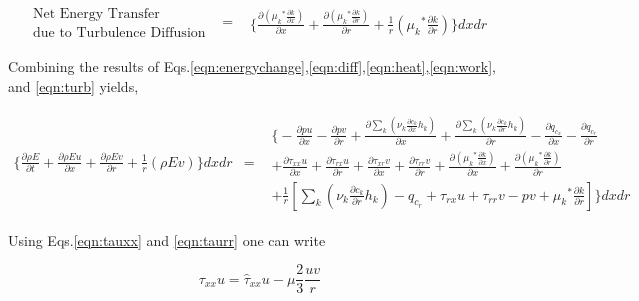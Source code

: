 \begin{equation}
	\begin{array}{ccc}
	\begin{array}{c}
	\textrm{Net Energy Transfer} \\ \textrm{due to Turbulence Diffusion}
	\end{array} & = &
		\begin{array}{c}
			\Big\{\frac{\partial ({\mu_k}^* \frac{\partial k}{\partial x})}{\partial x} 
			+ \frac{\partial ({\mu_k}^* \frac{\partial k}{\partial r})}{\partial r}
			+ \frac{1}{r} ({\mu_k}^* \frac{\partial k}{\partial r})\Big\}dxdr
		\end{array}
	\end{array}
\label{eqn:turb}
\end{equation}

	Combining the results of Eqs.\ref{eqn:energychange},\ref{eqn:diff},\ref{eqn:heat},\ref{eqn:work}, and \ref{eqn:turb} 
yields,

\begin{equation}
	\begin{array}{ccc}
		\Big\{\frac{\partial \rho E}{\partial t} +\frac{\partial \rho E u}{\partial x} + \frac{\partial \rho E v}
		{\partial r} + \frac{1}{r}(\rho E v)\Big\}dxdr & = &
		\begin{array}{c}
			\Big\{-\frac{\partial pu}{\partial x} -\frac{\partial pv}{\partial r}
			+\frac{\partial \sum_k (\nu_k \frac{\partial c_k}{\partial x}h_k)}{\partial x} 
			+ \frac{\partial \sum_k (\nu_k \frac{\partial c_k}{\partial r}h_k)}{\partial r}
			-\frac{\partial q_{c_x}}{\partial x} - \frac{\partial q_{c_r}}{\partial r} \\
			+ \frac{\partial \tau_{xx}u}{\partial x} + \frac{\partial \tau_{rx}u}{\partial r} 
			+ \frac{\partial \tau_{xr}v}{\partial x} + \frac{\partial \tau_{rr}v}{\partial r} 
			+ \frac{\partial({\mu_k}^* \frac{\partial k}{\partial x})}{\partial x} 
			+ \frac{\partial ({\mu_k}^* \frac{\partial k}{\partial r})}{\partial r} \\
			+\frac{1}{r}[\sum_k (\nu_k \frac{\partial c_k}{\partial r}h_k) - q_{c_r} + \tau_{rx}u + \tau_{rr}v - pv
			+ {\mu_k}^* \frac{\partial k}{\partial r}]\Big\}dxdr	
		\end{array}  
	\end{array}	
\label{eqn:energyshear}
\end{equation}

	Using Eqs.\ref{eqn:tauxx} and \ref{eqn:taurr} one can write

\begin{displaymath}
	\tau_{xx}u = \hat \tau_{xx} u - \mu \frac{2}{3} \frac {uv}{r}  
\end{displaymath}

